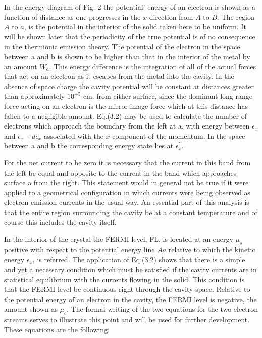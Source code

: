 \documentclass[11pt,a4paper]{article}
\begin{document}
	In the energy diagram of Fig. 2 the potential' energy of an electron is shown
	as a function of distance as one progresses in the $x$ direction from $A$ to $B$. The region $A$ to $a$, is the potential in the interior of the solid taken here to be uniform.
	It will be shown later that the periodicity of the true potential is of no consequence in the thermionic emission theory. The potential of the electron in the
	space between a and b is shown to be higher than that in the interior of the metal
	by an amount $W_a$. This energy difference is the integration of all of the actual
	forces that act on an electron as it escapes from the metal into the cavity. In
	the absence of space charge the cavity potential will be constant at distances
	greater than approximately $10^{-5}$ cm. from either surface, since the dominant
	long-range force acting on an electron is the mirror-image force which at this
	distance has fallen to a negligible amount. Eq.(3.2) may be used to calculate
	the number of electrons which approach the boundary from the left at a, with
	energy between $\epsilon_x$ and $\epsilon_x$ $ + d\epsilon_x$ associated with the $x$ component of the momentum. In the space between a and b the corresponding energy state lies at $\epsilon_x^{'}$.
	
	
	
	
	
	
	For the net current to be zero it is necessary that the current in this band from
	the left be equal and opposite to the current in the band which approaches surface a from the right. This statement would in general not be true if it were
	applied to a geometrical configuration in which currents were being observed
	as electron emission currents in the usual way. An essential part of this analysis
	is that the entire region surrounding the cavity be at a constant temperature
	and of course this includes the cavity itself.
	
	In the interior of the crystal the FERMI level, FL, is located at an energy $\mu_s$
	positive with respect to the potential energy line $Aa$ relative to which the kinetic
	energy $\epsilon_x$, is referred. The application of Eq.(3.2) shows that there is a simple
	and yet a necessary condition which must be satisfied if the cavity currents are
	in statistical equilibrium with the currents flowing in the solid. This condition
	is that the FERMI level be continuous right through the cavity space. Relative
	to the potential energy of an electron in the cavity, the FERMI level is negative,
	the amount shown as $\mu_c$. The formal writing of the two equations for the two
	electron streams serves to illustrate this point and will be used for further development. These equations are the following:
	
\end{document}
